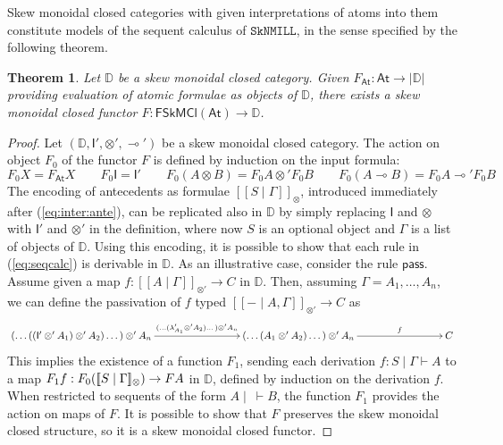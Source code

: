 \documentclass[copyright,creativecommons]{eptcs}
\newtheorem{theorem}{Theorem}[section]
\theoremstyle{definition}
\newcommand{\ldbc}{[\![}
\newcommand{\rdbc}{]\!]}
\newcommand{\pass}{\mathsf{pass}}
\newcommand{\ot}{\otimes}
\newcommand{\lolli}{\multimap}
\newcommand{\I}{\mathsf{I}}
\newcommand{\SkNMILL}{$\mathtt{SkNMILL}$}
\newcommand{\FSkMCC}{\mathsf{FSkMCl}}
\begin{document}
Skew monoidal closed categories with given interpretations of atoms into them constitute models of the sequent calculus of \SkNMILL, in the sense specified by the following theorem.
\begin{theorem}\label{thm:models}
  Let $\mathbb{D}$ be a skew monoidal closed category. Given $F_{\mathsf{At}} : \mathsf{At} \rightarrow |\mathbb{D}|$ providing evaluation of atomic formulae as objects of $\mathbb{D}$, there exists a skew monoidal closed functor $F : \FSkMCC(\mathsf{At}) \rightarrow \mathbb{D}$.
\end{theorem}
\begin{proof}
  Let $(\mathbb{D} , \I' , \ot' , \lolli')$ be a skew monoidal closed category.
  The action on object $F_0$ of the functor $F$ is defined by induction on the input formula:
  \begin{equation*}
    F_0X = F_{\mathsf{At}}X
    \qquad
    F_0\I = \I'
    \qquad
    F_0(A \ot B) = F_0A \ot' F_0B
    \qquad
    F_0(A \lolli B) = F_0A \lolli' F_0B
  \end{equation*}
  The encoding of antecedents as formulae $\ldbc S \mid \Gamma \rdbc_{\ot}$, introduced immediately after (\ref{eq:inter:ante}), can be replicated also in $\mathbb{D}$ by simply replacing $\I$ and $\ot$ with $\I'$ and $\ot'$ in the definition, where now $S$ is an optional object and $\Gamma$ is a list of objects of $\mathbb{D}$. Using this encoding, it is possible to show that each rule in (\ref{eq:seqcalc}) is derivable in $\mathbb{D}$. As an illustrative case, consider the rule $\pass$. Assume given a map $f : \ldbc A \mid \Gamma \rdbc_{\ot'} \to C$ in $\mathbb{D}$. Then, assuming $\Gamma = A_1,\dots,A_n$, we can define the passivation of $f$ typed $\ldbc {-} \mid A, \Gamma \rdbc_{\ot'} \to C$ as
\[\xymatrixcolsep{7pc}
\xymatrix{
  (\dots ((\I' \ot' A_1) \ot' A_2) \dots ) \ot' A_n
  \ar[r]^-{(\dots (\lambda'_{A_1} \ot' A_2) \dots ) \ot' A_n} &
  (\dots (A_1 \ot' A_2) \dots ) \ot' A_n
  \ar[r]^-{f} &
  C
}
\]
This implies the existence of a function $F_1$, sending each derivation $f : S \mid \Gamma \vdash A$ to a map $F_1f : \linebreak F_0(\ldbc S \mid \Gamma \rdbc_{\ot}) \to FA$ in $\mathbb{D}$, defined by induction on the derivation $f$. When restricted to sequents of the form $A \mid ~ \vdash B$, the function $F_1$ provides the action on maps of $F$.
It is possible to show that $F$ preserves the skew monoidal closed structure, so it is a skew monoidal closed functor.
\end{proof}
\end{document}
